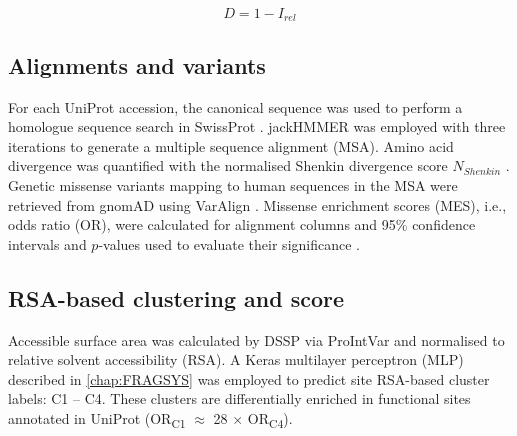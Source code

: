 \vspace{-12pt} %
\vspace{-12pt} %

\begin{equation}
D = 1 - I_{rel}
\label{eq:Irel_distance}
\end{equation}

\vspace{-12pt} %
\vspace{-12pt} %
\vspace{-12pt} %
\vspace{-12pt} %

\subsection{Alignments and variants}

For each UniProt accession, the canonical sequence was used to perform a homologue sequence search in SwissProt \cite{BOUTET_2016_UNIPROT}. jackHMMER \cite{EDDY_1995_HMMER} was employed with three iterations to generate a multiple sequence alignment (MSA). Amino acid divergence was quantified with the normalised Shenkin divergence score \cite{SHENKIN_1991_SCORE} $N_{Shenkin}$ \cite{UTGES_2021_ANKS}. Genetic missense variants mapping to human sequences in the MSA were retrieved from gnomAD \cite{KARCZEWSKI_2020_GNOMAD} using VarAlign \cite{MACGOWAN_2017_VARIANTS}. Missense enrichment scores (MES), i.e., odds ratio (OR), were calculated for alignment columns \cite{MACGOWAN_2024_VARIANTS} and 95\% confidence intervals and $p$-values used to evaluate their significance \cite{SZUMILAS_2010_ODDSRATIOS}.

\subsection{RSA-based clustering and score}

Accessible surface area was calculated by DSSP \cite{KABSCH_1983_DSSP} via ProIntVar \cite{MACGOWAN_2020_DRSASP} and normalised \cite{TIEN_2013_RSA} to relative solvent accessibility (RSA). A Keras \cite{CHOLLET_2015_KERAS} multilayer perceptron (MLP) \cite{CYBENKO_1989_MLP} described in \autoref{chap:FRAGSYS} \cite{UTGES_2024_FRAGSYS} was employed to predict site RSA-based cluster labels: C1 – C4. These clusters are differentially enriched in functional sites annotated in UniProt \cite{NIGHTINGALE_2017_API} (OR\textsubscript{C1} $\approx$ 28 $\times$ OR\textsubscript{C4}).

